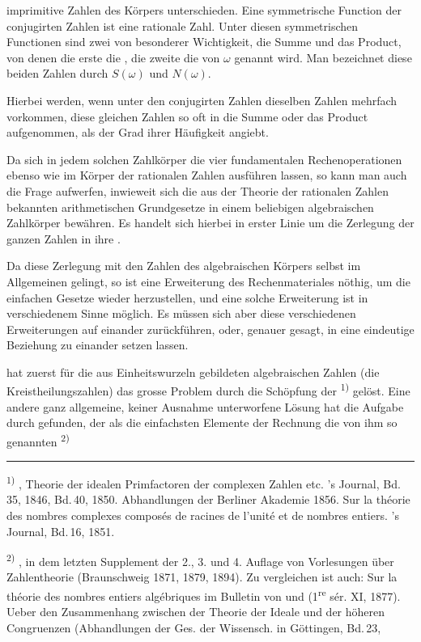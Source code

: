 
imprimitive Zahlen des K\"orpers unterschieden. Eine symmetrische Function
der conjugirten Zahlen ist eine rationale Zahl. Unter diesen symmetrischen
Functionen sind zwei von besonderer Wichtigkeit, die Summe und das Product,
von denen die erste die , die zweite die  von
$\omega$ genannt wird. Man bezeichnet diese beiden Zahlen durch $S(\omega)$
und $N(\omega)$.

Hierbei werden, wenn unter den conjugirten Zahlen dieselben Zahlen mehrfach
vorkommen, diese gleichen Zahlen so oft in die Summe oder das Product
aufgenommen, als der Grad ihrer H\"aufigkeit angiebt.

Da sich in jedem solchen Zahlk\"orper die vier fundamentalen
Rechenoperationen ebenso wie im K\"orper der rationalen Zahlen ausf\"uhren
lassen, so kann man auch die Frage aufwerfen, inwieweit sich die aus der
Theorie der rationalen Zahlen bekannten arithmetischen Grundgesetze in einem
beliebigen algebraischen Zahlk\"orper bew\"ahren. Es handelt sich hierbei in
erster Linie um die Zerlegung der ganzen Zahlen in ihre .

Da diese Zerlegung mit den Zahlen des algebraischen K\"orpers selbst im
Allgemeinen  gelingt, so ist eine Erweiterung des
Rechenmateriales n\"othig, um die einfachen Gesetze wieder herzustellen, und
eine solche Erweiterung ist in verschiedenem Sinne m\"oglich. Es m\"ussen
sich aber diese verschiedenen Erweiterungen auf einander zur\"uckf\"uhren,
oder, genauer gesagt, in eine eindeutige Beziehung zu einander setzen
lassen.

 hat zuerst f\"ur die aus Einheitswurzeln gebildeten
algebraischen Zahlen (die Kreistheilungszahlen) das grosse Problem durch die
Sch\"opfung der \textsuperscript{1)} gel\"ost. Eine
andere ganz allgemeine, keiner Ausnahme unterworfene L\"osung hat die
Aufgabe durch  gefunden, der als die einfachsten Elemente
der Rechnung die von ihm so genannten \textsuperscript{2)}

\vspace{1em}\hrule\vspace{0.5em}

\noindent\textsuperscript{1)} , Theorie der idealen
Primfactoren der complexen Zahlen etc. 's Journal, Bd.\,35, 1846,
Bd.\,40, 1850. Abhandlungen der Berliner Akademie 1856. Sur la th\'eorie des
nombres complexes compos\'es de racines de l'unit\'e et de nombres entiers.
's Journal, Bd.\,16, 1851.

\noindent\textsuperscript{2)} , in dem letzten Supplement
der 2., 3. und 4. Auflage von  Vorlesungen \"uber
Zahlentheorie (Braunschweig 1871, 1879, 1894). Zu vergleichen ist auch: Sur
la th\'eorie des nombres entiers alg\'ebriques im Bulletin von
 und  (1\textsuperscript{re} s\'er. XI,
1877). Ueber den Zusammenhang zwischen der Theorie der Ideale und der
h\"oheren Congruenzen (Abhandlungen der Ges. der Wissensch. in G\"ottingen,
Bd.\,23,
